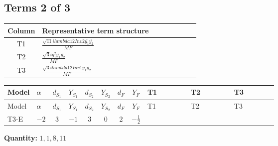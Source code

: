 \documentclass[8pt]{article}
\begin{document}
\begin{landscape}
\subsection*{Terms 2 of 3}
\begin{center}
\begin{tabular}{@{}c >{\raggedright\arraybackslash}p{0.82\linewidth}@{}}
\toprule
Column & Representative term structure \\
\midrule
T1 & \(\displaystyle \frac{\sqrt{11} i lambda12Inv2 \overline{y_{1}} \overline{y_{2}}}{MF}\) \\
\midrule
T2 & \(\displaystyle \frac{\sqrt{3} i g_{1}^{2} \overline{y_{1}} \overline{y_{2}}}{MF}\) \\
\midrule
T3 & \(\displaystyle \frac{\sqrt{3} i lambda12Inv1 \overline{y_{1}} \overline{y_{2}}}{MF}\) \\
\midrule
\bottomrule
\end{tabular}
\end{center}
\smallskip
\tiny
\begin{longtable}{@{}llcccccc >{\raggedright\arraybackslash}p{0.21\linewidth} >{\raggedright\arraybackslash}p{0.21\linewidth} >{\raggedright\arraybackslash}p{0.21\linewidth}@{}}
\toprule
Model & $\alpha$ & $d_{S_1}$ & $Y_{S_1}$ & $d_{S_2}$ & $Y_{S_2}$ & $d_F$ & $Y_F$ & T1 & T2 & T3 \\
\midrule
\endfirsthead
\toprule
Model & $\alpha$ & $d_{S_1}$ & $Y_{S_1}$ & $d_{S_2}$ & $Y_{S_2}$ & $d_F$ & $Y_F$ & T1 & T2 & T3 \\
\midrule
\endhead
T3-E & $-2$ & $3$ & $-1$ & $3$ & $0$ & $2$ & $-\frac{1}{2}$ & \scriptsize\adjustbox{max width=\linewidth}{$\begin{gathered} - \frac{3 \sqrt{11} i lambda12Inv2 \overline{y_{1}} \overline{y_{2}}}{22 MF}\end{gathered}$} & \scriptsize\adjustbox{max width=\linewidth}{$\begin{gathered} - \frac{\sqrt{3} i g_{1}^{2} \overline{y_{1}} \overline{y_{2}}}{8 MF}\end{gathered}$} & \scriptsize\adjustbox{max width=\linewidth}{$\begin{gathered} \frac{\sqrt{3} i lambda12Inv1 \overline{y_{1}} \overline{y_{2}}}{6 MF}\end{gathered}$} \\
\midrule
\bottomrule
\end{longtable}
\clearpage
\noindent\textbf{Quantity: }$\mathrm{1,1,8,11}$\par\smallskip

\end{landscape}
\end{document}
